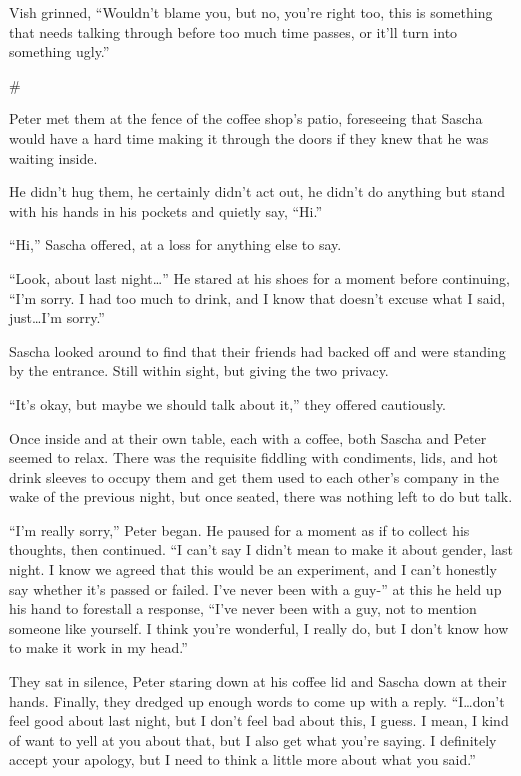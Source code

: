 \documentclass[12pt,letterpaper,oneside]{memoir}
\newcommand\secdiv{
  \begin{center}
    \#
  \end{center}
}
\begin{document}
  Vish grinned, ``Wouldn't blame you, but no, you're right too, this is something that needs talking through before too much time passes, or it'll turn into something ugly.''

  \secdiv

  Peter met them at the fence of the coffee shop's patio, foreseeing that Sascha would have a hard time making it through the doors if they knew that he was waiting inside.

  He didn't hug them, he certainly didn't act out, he didn't do anything but stand with his hands in his pockets and quietly say, ``Hi.''

  ``Hi,'' Sascha offered, at a loss for anything else to say.

  ``Look, about last night\ldots{}'' He stared at his shoes for a moment before continuing, ``I'm sorry. I had too much to drink, and I know that doesn't excuse what I said, just\ldots{}I'm sorry.''

  Sascha looked around to find that their friends had backed off and were standing by the entrance. Still within sight, but giving the two privacy.

  ``It's okay, but maybe we should talk about it,'' they offered cautiously.

  Once inside and at their own table, each with a coffee, both Sascha and Peter seemed to relax. There was the requisite fiddling with condiments, lids, and hot drink sleeves to occupy them and get them used to each other's company in the wake of the previous night, but once seated, there was nothing left to do but talk.

  ``I'm really sorry,'' Peter began. He paused for a moment as if to collect his thoughts, then continued. ``I can't say I didn't mean to make it about gender, last night. I know we agreed that this would be an experiment, and I can't honestly say whether it's passed or failed. I've never been with a guy-'' at this he held up his hand to forestall a response, ``I've never been with a guy, not to mention someone like yourself. I think you're wonderful, I really do, but I don't know how to make it work in my head.''

  They sat in silence, Peter staring down at his coffee lid and Sascha down at their hands. Finally, they dredged up enough words to come up with a reply. ``I\ldots{}don't feel good about last night, but I don't feel bad about this, I guess. I mean, I kind of want to yell at you about that, but I also get what you're saying. I definitely accept your apology, but I need to think a little more about what you said.''
\end{document}
